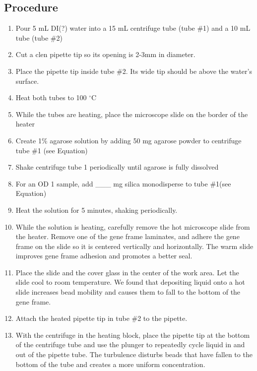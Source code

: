 \subsection{Procedure}
\begin{enumerate}
    \item Pour 5 mL DI(?) water into a 15 mL centrifuge tube (tube \#1) and a 10 mL tube (tube \#2)
    \item Cut a clen pipette tip so its opening is 2-3mm in diameter.
    \item Place the pipette tip inside tube \#2. Its wide tip should be above the water's surface.
    \item Heat both tubes to 100 $^\circ$C
    \item While the tubes are heating, place the microscope slide on the border of the heater
    \item Create 1\% agarose solution by adding 50 mg agarose powder to centrifuge tube \#1 (see Equation)
    \item Shake centrifuge tube 1 periodically until agarose is fully dissolved
    \item For an OD 1 sample, add \_\_\_ mg silica monodisperse to tube \#1(see Equation)
    \item Heat the solution for 5 minutes, shaking periodically.
    \item While the solution is heating, carefully remove the hot microscope slide from the heater. Remove one of the gene frame laminates, and adhere the gene frame on the slide so it is centered vertically and horizontally. The warm slide improves gene frame adhesion and promotes a better seal.
    \item Place the slide and the cover glass in the center of the work area. Let the slide cool to room temperature. We found that depositing liquid onto a hot slide increases bead mobility and causes them to fall to the bottom of the gene frame.
    \item Attach the heated pipette tip in tube \#2 to the pipette.
    \item With the centrifuge in the heating block, place the pipette tip at the bottom of the centrifuge tube and use the plunger to repeatedly cycle liquid in and out of the pipette tube. The turbulence disturbs beads that have fallen to the bottom of the tube and creates a more uniform concentration.

\end{enumerate}
